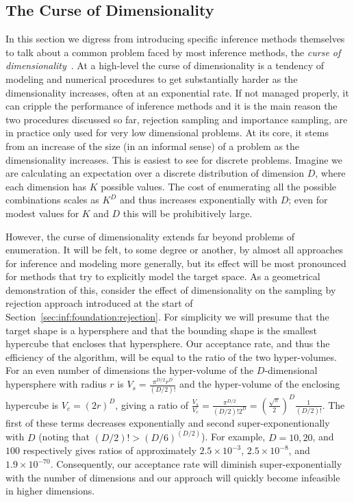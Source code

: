 
\subsection{The Curse of Dimensionality}
\label{sec:inf:foundation:curse}

In this section we digress from introducing specific inference methods themselves
to talk about a common problem faced by most inference methods, the
\emph{curse of dimensionality}~\citep{bellman1961adaptive}.  At a high-level the curse of 
dimensionality is a tendency
of modeling and numerical procedures to get substantially harder as the dimensionality increases, 
often at an exponential rate.  If not managed properly, it can cripple the performance of
inference methods and it is the main reason the two procedures discussed so far, rejection
sampling and importance sampling, are in practice only used for very low dimensional problems.
At its core, it stems from an increase of the size (in an informal sense) of a problem as the
dimensionality increases.  This is easiest to see for discrete problems.   Imagine we are calculating
an expectation over a discrete distribution of dimension $D$, where each dimension has $K$
possible values.  The cost of enumerating all the possible combinations scales as $K^D$ and thus
increases exponentially with $D$; even for modest values for $K$ and $D$ this will 
be prohibitively large.

However, the curse of dimensionality extends far beyond problems of enumeration.  It will be felt, to
some degree or another, by almost all approaches for inference and modeling more generally,
but its effect will be most pronounced for methods that try to explicitly model the target
space.  As a geometrical demonstration of this, consider the effect of dimensionality on 
the sampling by rejection approach introduced at the start of Section~\ref{sec:inf:foundation:rejection}.
For simplicity we will presume that the target shape is a hypersphere and that
the bounding shape is the smallest hypercube that encloses that hypersphere.  Our acceptance rate,
and thus the efficiency of the algorithm, will be equal to the ratio of the two hyper-volumes.  
For an even number of dimensions
the hyper-volume of the $D$-dimensional hypersphere with radius $r$ is $V_{s} = \frac{\pi^{D/2}r^D}{(D/2)!}$
and the hyper-volume of the enclosing hypercube is $V_c = (2r)^D$, giving a ratio of
$\frac{V_s}{V_c} = \frac{\pi^{D/2}}{(D/2)! 2^D} = \left(\frac{\sqrt{\pi}}{2}\right)^D\frac{1}{(D/2)!}$.
The first of these terms decreases exponentially and second
super-exponentionally with $D$ (noting that $(D/2)!>(D/6)^{(D/2)}$).  
For example, $D=10, 20$, and $100$ respectively gives ratios of approximately
$2.5 \times 10^{-3}$, $2.5 \times 10^{-8}$, and $1.9\times 10^{-70}$.  
Consequently, our acceptance rate will diminish
super-exponentially with the number of dimensions and our approach will quickly become
infeasible in higher dimensions.

